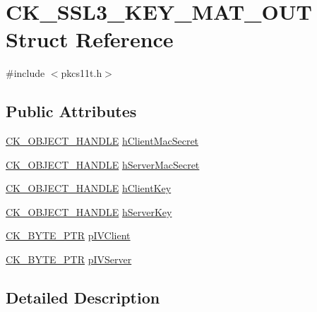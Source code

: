 \hypertarget{struct_c_k___s_s_l3___k_e_y___m_a_t___o_u_t}{}\section{C\+K\+\_\+\+S\+S\+L3\+\_\+\+K\+E\+Y\+\_\+\+M\+A\+T\+\_\+\+O\+UT Struct Reference}
\label{struct_c_k___s_s_l3___k_e_y___m_a_t___o_u_t}


{\ttfamily \#include $<$pkcs11t.\+h$>$}

\subsection*{Public Attributes}
\begin{DoxyCompactItemize}
\item 
\hyperlink{pkcs11t_8h_ad1cdd703196214cd34e6f9f52bc67683}{C\+K\+\_\+\+O\+B\+J\+E\+C\+T\+\_\+\+H\+A\+N\+D\+LE} \hyperlink{struct_c_k___s_s_l3___k_e_y___m_a_t___o_u_t_a9ab1eebd1213b9a4e0edd87c0543b26c}{h\+Client\+Mac\+Secret}
\item 
\hyperlink{pkcs11t_8h_ad1cdd703196214cd34e6f9f52bc67683}{C\+K\+\_\+\+O\+B\+J\+E\+C\+T\+\_\+\+H\+A\+N\+D\+LE} \hyperlink{struct_c_k___s_s_l3___k_e_y___m_a_t___o_u_t_a5de25eb03ea61a0a25054d5aeacd682f}{h\+Server\+Mac\+Secret}
\item 
\hyperlink{pkcs11t_8h_ad1cdd703196214cd34e6f9f52bc67683}{C\+K\+\_\+\+O\+B\+J\+E\+C\+T\+\_\+\+H\+A\+N\+D\+LE} \hyperlink{struct_c_k___s_s_l3___k_e_y___m_a_t___o_u_t_aa01518b6ad293460acad4ba95886c622}{h\+Client\+Key}
\item 
\hyperlink{pkcs11t_8h_ad1cdd703196214cd34e6f9f52bc67683}{C\+K\+\_\+\+O\+B\+J\+E\+C\+T\+\_\+\+H\+A\+N\+D\+LE} \hyperlink{struct_c_k___s_s_l3___k_e_y___m_a_t___o_u_t_a3a1912610629182d4fe1a27f18602f04}{h\+Server\+Key}
\item 
\hyperlink{pkcs11t_8h_a3d7233a4077fbaf7ae76b64da0a62a21}{C\+K\+\_\+\+B\+Y\+T\+E\+\_\+\+P\+TR} \hyperlink{struct_c_k___s_s_l3___k_e_y___m_a_t___o_u_t_a21259dbabcc7588455addfbddc207312}{p\+I\+V\+Client}
\item 
\hyperlink{pkcs11t_8h_a3d7233a4077fbaf7ae76b64da0a62a21}{C\+K\+\_\+\+B\+Y\+T\+E\+\_\+\+P\+TR} \hyperlink{struct_c_k___s_s_l3___k_e_y___m_a_t___o_u_t_aab8e3a04c7ababeaf39ae5692a6c4178}{p\+I\+V\+Server}
\end{DoxyCompactItemize}


\subsection{Detailed Description}


